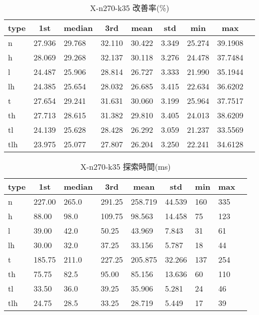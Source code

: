\begin{table}[htbp]
    \caption{X-n270-k35 改善率(\%)}
    \begin{tabular}{|l|l|l|l|l|l|l|l|l|}\hline
    \multicolumn{1}{|c|}{\textbf{type}}
    &\multicolumn{1}{|c|}{\textbf{1st}}
    &\multicolumn{1}{c|}{\textbf{median}}
    &\multicolumn{1}{c|}{\textbf{3rd}}
    &\multicolumn{1}{c|}{\textbf{mean}}
    &\multicolumn{1}{c|}{\textbf{std}}
    &\multicolumn{1}{c|}{\textbf{min}}
    &\multicolumn{1}{c|}{\textbf{max}}\\\hline
	n & 27.936 & 29.768 & 32.110 & 30.422 & 3.349 & 25.274 & 39.1908\\\hline
	h & 28.069 & 29.268 & 32.137 & 30.118 & 3.276 & 24.478 & 37.7484\\\hline
	l & 24.487 & 25.906 & 28.814 & 26.727 & 3.333 & 21.990 & 35.1944\\\hline
	lh & 24.385 & 25.654 & 28.032 & 26.685 & 3.415 & 22.634 & 36.6202\\\hline
	t & 27.654 & 29.241 & 31.631 & 30.060 & 3.199 & 25.964 & 37.7517\\\hline
	th & 27.713 & 28.615 & 31.382 & 29.810 & 3.405 & 24.013 & 38.6209\\\hline
	tl & 24.139 & 25.628 & 28.428 & 26.292 & 3.059 & 21.237 & 33.5569\\\hline
	tlh & 23.975 & 25.077 & 27.807 & 26.204 & 3.250 & 22.241 & 34.6128\\\hline
	\end{tabular}
\end{table}
\begin{table}[htbp]
    \caption{X-n270-k35 探索時間(ms)}
    \begin{tabular}{|l|l|l|l|l|l|l|l|l|}\hline
    \multicolumn{1}{|c|}{\textbf{type}}
    &\multicolumn{1}{|c|}{\textbf{1st}}
    &\multicolumn{1}{c|}{\textbf{median}}
    &\multicolumn{1}{c|}{\textbf{3rd}}
    &\multicolumn{1}{c|}{\textbf{mean}}
    &\multicolumn{1}{c|}{\textbf{std}}
    &\multicolumn{1}{c|}{\textbf{min}}
    &\multicolumn{1}{c|}{\textbf{max}}\\\hline
	n & 227.00 & 265.0 & 291.25 & 258.719 & 44.539 & 160 & 335\\\hline
	h & 88.00 & 98.0 & 109.75 & 98.563 & 14.458 & 75 & 123\\\hline
	l & 39.00 & 42.0 & 50.25 & 43.969 & 7.843 & 31 & 61\\\hline
	lh & 30.00 & 32.0 & 37.25 & 33.156 & 5.787 & 18 & 44\\\hline
	t & 185.75 & 211.0 & 227.25 & 205.875 & 32.266 & 137 & 254\\\hline
	th & 75.75 & 82.5 & 95.00 & 85.156 & 13.636 & 60 & 110\\\hline
	tl & 33.50 & 36.0 & 39.25 & 35.906 & 5.281 & 24 & 46\\\hline
	tlh & 24.75 & 28.5 & 33.25 & 28.719 & 5.449 & 17 & 39\\\hline
	\end{tabular}
\end{table}
